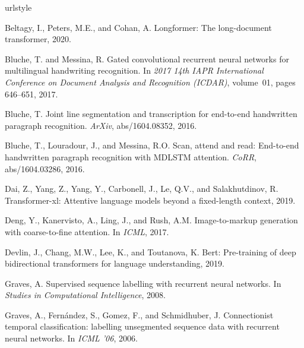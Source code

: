 \documentclass[runningheads]{llncs}
\begin{document}
\begin{thebibliography}{33}
\providecommand{\natexlab}[1]{#1}
\providecommand{\url}[1]{\texttt{#1}}
\expandafter\ifx\csname urlstyle\endcsname\relax
  \providecommand{\doi}[1]{doi: #1}\else
  \providecommand{\doi}{doi: \begingroup \urlstyle{rm}\Url}\fi

Beltagy, I., Peters, M.E., and Cohan, A.
\newblock Longformer: The long-document transformer, 2020.

{Bluche}, T. and {Messina}, R.
\newblock Gated convolutional recurrent neural networks for multilingual
  handwriting recognition.
\newblock In \emph{2017 14th IAPR International Conference on Document Analysis
  and Recognition (ICDAR)}, volume~01, pages 646--651, 2017.

Bluche, T.
\newblock Joint line segmentation and transcription for end-to-end handwritten
  paragraph recognition.
\newblock \emph{ArXiv}, abs/1604.08352, 2016.

Bluche, T., Louradour, J., and Messina, R.O.
\newblock Scan, attend and read: End-to-end handwritten paragraph recognition
  with {MDLSTM} attention.
\newblock \emph{CoRR}, abs/1604.03286, 2016.

Dai, Z., Yang, Z., Yang, Y., Carbonell, J., Le, Q.V., and Salakhutdinov, R.
\newblock Transformer-xl: Attentive language models beyond a fixed-length
  context, 2019.

Deng, Y., Kanervisto, A., Ling, J., and Rush, A.M.
\newblock Image-to-markup generation with coarse-to-fine attention.
\newblock In \emph{ICML}, 2017.

Devlin, J., Chang, M.W., Lee, K., and Toutanova, K.
\newblock Bert: Pre-training of deep bidirectional transformers for language
  understanding, 2019.

Graves, A.
\newblock Supervised sequence labelling with recurrent neural networks.
\newblock In \emph{Studies in Computational Intelligence}, 2008.

Graves, A., Fern{\'a}ndez, S., Gomez, F., and Schmidhuber, J.
\newblock Connectionist temporal classification: labelling unsegmented sequence
  data with recurrent neural networks.
\newblock In \emph{ICML '06}, 2006.


\end{thebibliography}
\end{document}

